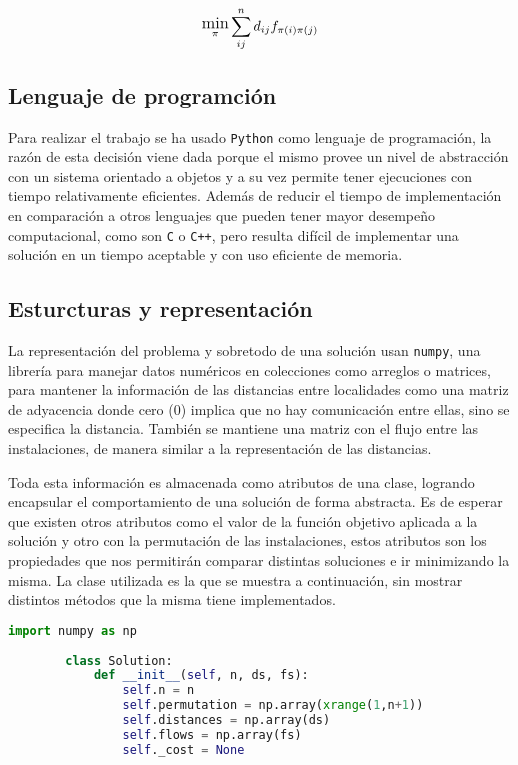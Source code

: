 \[\substack{\text{\large min} \\ \pi}\sum_{ij}^{n} d_{ij}f_{\pi(i)\pi(j)}\]

\subsection*{Lenguaje de programción}

Para realizar el trabajo se ha usado \texttt{Python} como lenguaje de programación, la razón de esta decisión viene dada porque el mismo provee un nivel de abstracción con un sistema orientado a objetos y a su vez permite tener ejecuciones con tiempo relativamente eficientes. Además de reducir el tiempo de implementación en comparación a otros lenguajes que pueden tener mayor desempeño computacional, como son \texttt{C} o \texttt{C++}, pero resulta difícil de implementar una solución en un tiempo aceptable y con uso eficiente de memoria.

\subsection*{Esturcturas y representación}

La representación del problema y sobretodo de una solución usan \texttt{numpy}, una librería para manejar datos numéricos en colecciones como arreglos o matrices, para mantener la información de las distancias entre localidades como una matriz de adyacencia donde cero ($0$) implica que no hay comunicación entre ellas, sino se especifica la distancia. También se mantiene una matriz con el flujo entre las instalaciones, de manera similar a la representación de las distancias.

Toda esta información es almacenada como atributos de una clase, logrando encapsular el comportamiento de una solución de forma abstracta. Es de esperar que existen otros atributos como el valor de la función objetivo aplicada a la solución y otro con la permutación de las instalaciones, estos atributos son los propiedades que nos permitirán comparar distintas soluciones e ir minimizando la misma. La clase utilizada es la que se muestra a continuación, sin mostrar distintos métodos que la misma tiene implementados.

\begin{lstlisting}[language=Python]
        import numpy as np
         
        class Solution:
            def __init__(self, n, ds, fs):
                self.n = n
                self.permutation = np.array(xrange(1,n+1))
                self.distances = np.array(ds)
                self.flows = np.array(fs)
                self._cost = None
\end{lstlisting}

